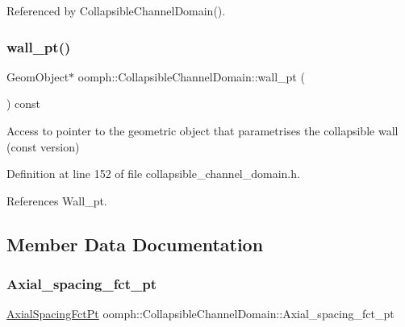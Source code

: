 Referenced by Collapsible\+Channel\+Domain().

\mbox{\label{classoomph_1_1CollapsibleChannelDomain_a48237d8c4d10ff3ccdf68d02da5b29c7}} 
\subsubsection{\texorpdfstring{wall\+\_\+pt()}{wall\_pt()}\hspace{0.1cm}{\footnotesize\ttfamily [2/2]}}
{\footnotesize\ttfamily Geom\+Object$\ast$ oomph\+::\+Collapsible\+Channel\+Domain\+::wall\+\_\+pt (\begin{DoxyParamCaption}{ }\end{DoxyParamCaption}) const\hspace{0.3cm}{\ttfamily [inline]}}



Access to pointer to the geometric object that parametrises the collapsible wall (const version) 



Definition at line 152 of file collapsible\+\_\+channel\+\_\+domain.\+h.



References Wall\+\_\+pt.



\subsection{Member Data Documentation}
\mbox{\label{classoomph_1_1CollapsibleChannelDomain_a6f4c3319be685553715f5cd776eea0fc}} 
\subsubsection{\texorpdfstring{Axial\+\_\+spacing\+\_\+fct\+\_\+pt}{Axial\_spacing\_fct\_pt}}
{\footnotesize\ttfamily \hyperlink{classoomph_1_1CollapsibleChannelDomain_a317472dab112beac771ecf6442a465f5}{Axial\+Spacing\+Fct\+Pt} oomph\+::\+Collapsible\+Channel\+Domain\+::\+Axial\+\_\+spacing\+\_\+fct\+\_\+pt\hspace{0.3cm}{\ttfamily [private]}}



